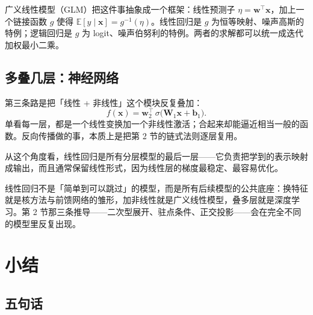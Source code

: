 \documentclass[11pt,a4paper,fontset=windows,zihao=-4]{ctexart}
\newcommand{\bw}{\mathbf{w}}
\newcommand{\bx}{\mathbf{x}}
\newcommand{\bb}{\mathbf{b}}
\newcommand{\bW}{\mathbf{W}}
\newcommand{\tp}{^{\top}}
\begin{document}
广义线性模型（GLM）把这件事抽象成一个框架：线性预测子 $\eta=\bw\tp\bx$，加上一个链接函数 $g$ 使得 $\mathbb E[y\mid\bx]=g^{-1}(\eta)$。线性回归是 $g$ 为恒等映射、噪声高斯的特例；逻辑回归是 $g$ 为 logit、噪声伯努利的特例。两者的求解都可以统一成迭代加权最小二乘。

\subsection{多叠几层：神经网络}

第三条路是把「线性 + 非线性」这个模块反复叠加：
\begin{equation}
  f(\bx)=\bw_2\tp\,\sigma\bigl(\bW_1\bx+\bb_1\bigr).
\end{equation}
单看每一层，都是一个线性变换加一个非线性激活；合起来却能逼近相当一般的函数。反向传播做的事，本质上是把第 2 节的链式法则逐层复用。

从这个角度看，线性回归是所有分层模型的最后一层——它负责把学到的表示映射成输出，而且通常保留线性形式，因为线性层的梯度最稳定、最容易优化。

\begin{keybox}[一句话]
线性回归不是「简单到可以跳过」的模型，而是所有后续模型的公共底座：换特征就是核方法与前馈网络的雏形，加非线性就是广义线性模型，叠多层就是深度学习。第 2 节那三条推导——二次型展开、驻点条件、正交投影——会在完全不同的模型里反复出现。
\end{keybox}


\section{小结}

\subsection{五句话}
\end{document}
